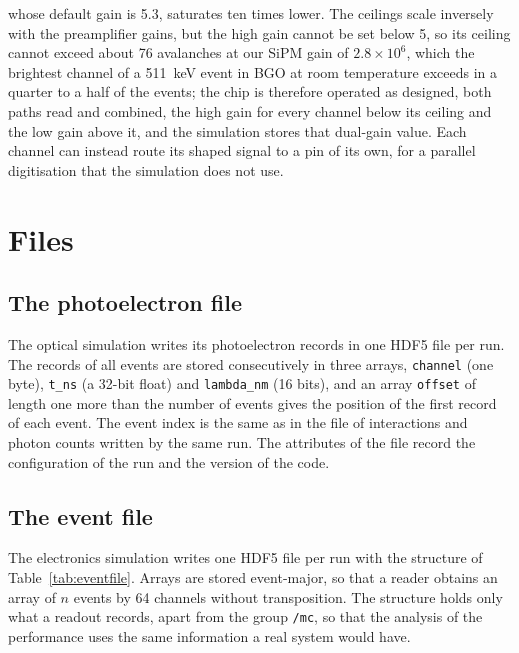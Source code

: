 \documentclass[11pt]{article}
\newcommand{\code}[1]{\texttt{#1}}
\begin{document}
\begin{enumerate}
  whose default gain is 5.3, saturates ten times lower. The ceilings scale
  inversely with the preamplifier gains, but the high gain cannot be set
  below 5, so its ceiling cannot exceed about 76 avalanches at our SiPM
  gain of $2.8 \times 10^6$, which the brightest channel of a 511~keV
  event in BGO at room temperature exceeds in a quarter to a half of the events; the
  chip is therefore operated as designed, both paths read and combined,
  the high gain for every channel below its ceiling and the low gain above
  it, and the simulation stores that dual-gain value. Each channel can
  instead route its shaped signal to a pin of its own, for a parallel
  digitisation that the simulation does not use.
\end{enumerate}

\section{Files}
\label{sec:formats}

\subsection{The photoelectron file}

The optical simulation writes its photoelectron records in one HDF5 file per
run. The records of all events are stored consecutively in three arrays,
\code{channel} (one byte), \code{t\_ns} (a 32-bit float) and
\code{lambda\_nm} (16 bits), and an array \code{offset} of length one more
than the number of events gives the position of the first record of each
event. The event index is the same as in the file of interactions and photon
counts written by the same run. The attributes of the file record the
configuration of the run and the version of the code.

\subsection{The event file}

The electronics simulation writes one HDF5 file per run with the structure
of Table~\ref{tab:eventfile}. Arrays are stored event-major, so that a
reader obtains an array of $n$ events by 64 channels without transposition.
The structure holds only what a readout records, apart from the group
\code{/mc}, so that the analysis of the performance uses the same
information a real system would have.
\end{document}
